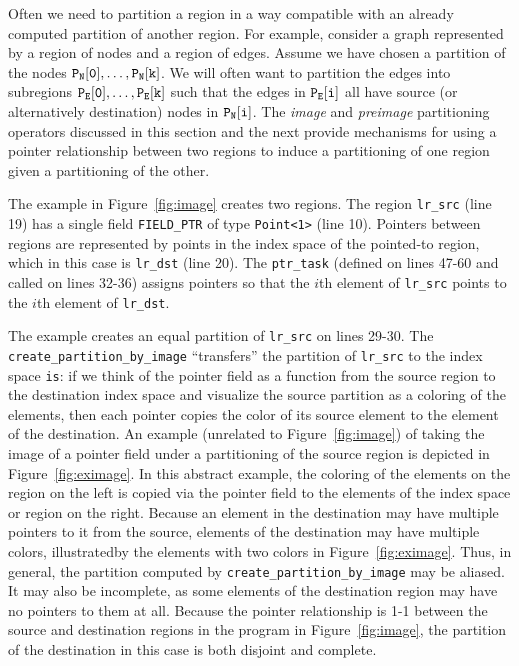   
Often we need to partition a region in a way compatible with an already computed partition of another region.
For example, consider a graph represented by a region of nodes and a region of edges. Assume we have chosen a partition of the nodes $\tt P_N[0],\ldots,P_N[k]$.
We will often want to partition the edges into subregions $\tt P_E[0],\ldots,P_E[k]$ such that the edges in $\tt P_E[i]$ all have source (or alternatively destination) nodes in $\tt P_N[i]$.  The {\em image} and {\em preimage} partitioning operators discussed in this section and the next provide mechanisms for using a pointer relationship between
two regions to induce a partitioning of one region given a partitioning of the other.

The example in Figure~\ref{fig:image} creates two regions.  The region {\tt lr\_src} (line 19) has a single field {\tt FIELD\_PTR} of type \verb+Point<1>+ (line 10).  Pointers
between regions are represented by points in the index space of the pointed-to region, which in this case is {\tt lr\_dst} (line 20).  The {\tt ptr\_task} (defined on lines 47-60 and called on lines 32-36) assigns pointers so that the $i$th element of {\tt lr\_src} points to the $i$th element of {\tt lr\_dst}.

The example creates an equal partition of {\tt lr\_src} on lines 29-30.  The {\tt create\_partition\_by\_image} ``transfers'' the partition of {\tt lr\_src} to the index space {\tt is}: if we think of the pointer field as a function from the source region to the destination index space and visualize the source partition as a coloring of the elements, then each pointer copies the color of its source element to the element of the destination.  An
example (unrelated to Figure~\ref{fig:image}) of taking the image of a pointer field under a partitioning of the source region is depicted in Figure~\ref{fig:eximage}.  In this abstract example, the coloring of the elements on the region on the left is copied via the pointer field to the elements of the index space or region on the right.  Because an element in the destination may have multiple pointers to it from the source, elements of the destination may have multiple colors, illustratedby the elements with two colors in Figure~\ref{fig:eximage}.  Thus, in general, the partition computed by {\tt create\_partition\_by\_image} may be aliased.  It may also be incomplete, as some elements of the destination region may have no pointers to them at all.  Because the pointer relationship is 1-1 between the source and destination regions
in the program in Figure~\ref{fig:image}, the partition of the destination in this case is both disjoint and complete.

